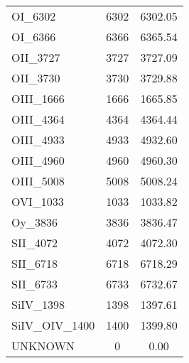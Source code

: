 \documentclass[upright, contnum]{umemoria}
\begin{document}
\begin{longtable}{l c c}
OI\_6302 & 6302 & 6302.05 \\
OI\_6366 & 6366 & 6365.54 \\
OII\_3727 & 3727 & 3727.09 \\
OII\_3730 & 3730 & 3729.88 \\
OIII\_1666 & 1666 & 1665.85 \\
OIII\_4364 & 4364 & 4364.44 \\
OIII\_4933 & 4933 & 4932.60 \\
OIII\_4960 & 4960 & 4960.30 \\
OIII\_5008 & 5008 & 5008.24 \\
OVI\_1033 & 1033 & 1033.82 \\
Oy\_3836 & 3836 & 3836.47 \\
SII\_4072 & 4072 & 4072.30 \\
SII\_6718 & 6718 & 6718.29 \\
SII\_6733 & 6733 & 6732.67 \\
SiIV\_1398 & 1398 & 1397.61 \\
SiIV\_OIV\_1400 & 1400 & 1399.80 \\
UNKNOWN & 0 & 0.00 \\
\end{longtable}
\end{document}
